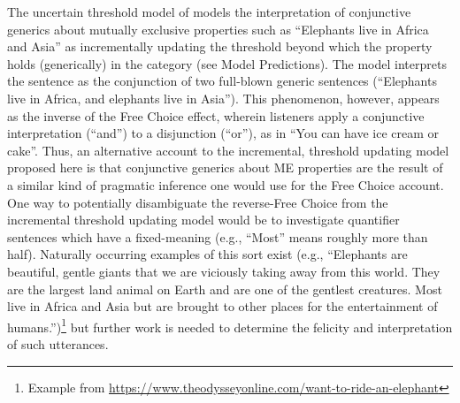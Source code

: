 \documentclass[10pt,letterpaper]{article}
\begin{document}
The uncertain threshold model of  models the interpretation of conjunctive generics about mutually exclusive properties such as ``Elephants live in Africa and Asia'' as incrementally updating the threshold beyond which the property holds (generically) in the category (see Model Predictions). 
The model interprets the sentence as the conjunction of two full-blown generic sentences (``Elephants live in Africa, and elephants live in Asia''). 
This phenomenon, however, appears as the inverse of the Free Choice effect, wherein listeners apply a conjunctive interpretation (``and'') to a disjunction (``or''), as in ``You can have ice cream or cake''. 
Thus, an alternative account to the incremental, threshold updating model proposed here is that conjunctive generics about ME properties are the result of a similar kind of pragmatic inference one would use for the Free Choice account. 
One way to potentially disambiguate the reverse-Free Choice from the incremental threshold updating model would be to investigate quantifier sentences which have a fixed-meaning (e.g., ``Most'' means roughly more than half).
Naturally occurring examples of this sort exist (e.g., ``Elephants are beautiful, gentle giants that we are viciously taking away from this world. They are the largest land animal on Earth and are one of the gentlest creatures. Most live in Africa and Asia but are brought to other places for the entertainment of humans.'')\footnote{
Example from \url{https://www.theodysseyonline.com/want-to-ride-an-elephant}
} but further work is needed to determine the felicity and interpretation of such utterances.







%




\setlength{\bibleftmargin}{.125in}
\setlength{\bibindent}{-\bibleftmargin}


\end{document}
